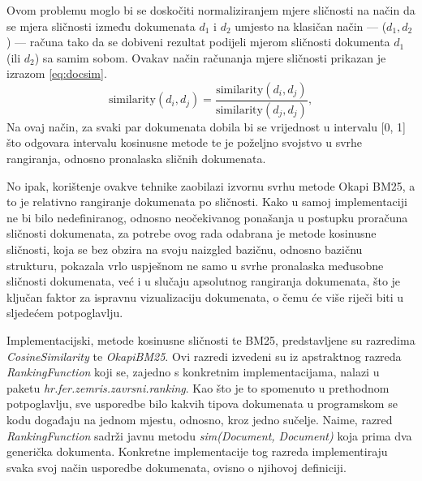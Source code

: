 \documentclass[times, utf8, zavrsni]{fer}
\begin{document}
Ovom problemu moglo bi se doskočiti normaliziranjem mjere sličnosti na način da se mjera sličnosti između dokumenata $d_1$ i $d_2$ umjesto na klasičan način — ($d_1, d_2$) — računa tako da se dobiveni rezultat podijeli mjerom sličnosti dokumenta $d_1$ (ili $d_2$) sa samim sobom. Ovakav način računanja mjere sličnosti prikazan je izrazom \ref{eq:docsim}.
\begin{equation}
\text{similarity}(d_i, d_j) = \frac{\text{similarity}(d_i, d_j)}{\text{similarity}(d_j, d_j)},
\label{eq:docsim}
\end{equation}
Na ovaj način, za svaki par dokumenata dobila bi se vrijednost u intervalu [0, 1] što odgovara intervalu kosinusne metode te je poželjno svojstvo u svrhe rangiranja, odnosno pronalaska sličnih dokumenata. \par
No ipak, korištenje ovakve tehnike zaobilazi izvornu svrhu metode Okapi BM25, a to je relativno rangiranje dokumenata po sličnosti. Kako u samoj implementaciji ne bi bilo nedefiniranog, odnosno neočekivanog ponašanja u postupku proračuna sličnosti dokumenata, za potrebe ovog rada odabrana je metode kosinusne sličnosti, koja se bez obzira na svoju naizgled bazičnu, odnosno bazičnu strukturu, pokazala vrlo uspješnom ne samo u svrhe pronalaska međusobne sličnosti dokumenata, već i u slučaju apsolutnog rangiranja dokumenata, što je ključan faktor za ispravnu vizualizaciju dokumenata, o čemu će više riječi biti u sljedećem potpoglavlju.

Implementacijski, metode kosinusne sličnosti te BM25, predstavljene su razredima \textit{CosineSimilarity} te \textit{OkapiBM25}. Ovi razredi izvedeni su iz apstraktnog razreda \textit{RankingFunction} koji se, zajedno s konkretnim implementacijama, nalazi u paketu \textit{hr.fer.zemris.zavrsni.ranking}. Kao što je to spomenuto u prethodnom potpoglavlju, sve usporedbe bilo kakvih tipova dokumenata u programskom se kodu događaju na jednom mjestu, odnosno, kroz jedno sučelje. Naime, razred \textit{RankingFunction} sadrži javnu metodu \textit{sim(Document, Document)} koja prima dva generička dokumenta. Konkretne implementacije tog razreda implementiraju svaka svoj način usporedbe dokumenata, ovisno o njihovoj definiciji.
\end{document}
